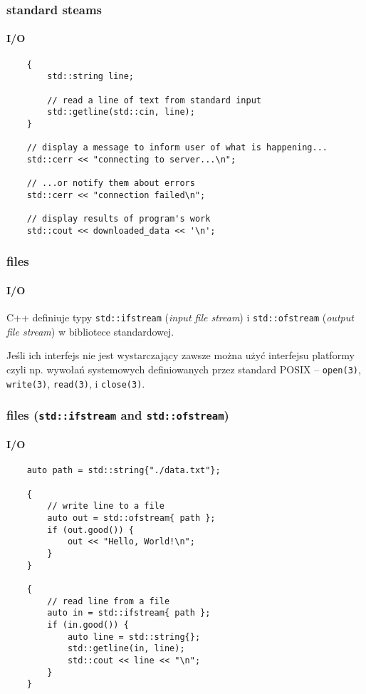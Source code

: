 \documentclass[aspectratio=169]{beamer}
\begin{document}
\begin{frame}[fragile]
    \frametitle{standard steams}
    \framesubtitle{I/O}

    {\scriptsize
    \begin{lstlisting}
    {
        std::string line;

        // read a line of text from standard input
        std::getline(std::cin, line);
    }

    // display a message to inform user of what is happening...
    std::cerr << "connecting to server...\n";

    // ...or notify them about errors
    std::cerr << "connection failed\n";

    // display results of program's work
    std::cout << downloaded_data << '\n';
    \end{lstlisting}}
\end{frame}

\begin{frame}
    \frametitle{files}
    \framesubtitle{I/O}

    C++ definiuje typy {\tt std::ifstream} (\emph{input file stream}) i
    {\tt std::ofstream} (\emph{output file stream}) w bibliotece standardowej.

    \vspace{1em}

    Jeśli ich interfejs nie jest wystarczający zawsze można użyć interfejsu
    platformy czyli np. wywołań systemowych definiowanych przez standard POSIX --
    {\tt open(3)}, {\tt write(3)}, {\tt read(3)}, i {\tt close(3)}.
\end{frame}

\begin{frame}[fragile]
    \frametitle{files ({\tt std::ifstream} and {\tt std::ofstream})}
    \framesubtitle{I/O}

    {\scriptsize
    \begin{lstlisting}
    auto path = std::string{"./data.txt"};

    {
        // write line to a file
        auto out = std::ofstream{ path };
        if (out.good()) {
            out << "Hello, World!\n";
        }
    }

    {
        // read line from a file
        auto in = std::ifstream{ path };
        if (in.good()) {
            auto line = std::string{};
            std::getline(in, line);
            std::cout << line << "\n";
        }
    }
    \end{lstlisting}}
\end{frame}
\end{document}
